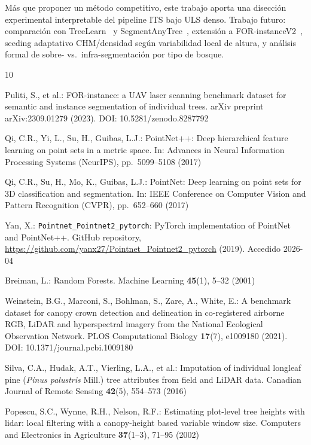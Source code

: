 \documentclass[runningheads]{llncs}
\begin{document}
Más que proponer un método competitivo, este trabajo aporta una disección experimental interpretable del pipeline ITS bajo ULS denso. Trabajo futuro: comparación con TreeLearn~\cite{henrich2024} y SegmentAnyTree~\cite{wielgosz2024}, extensión a FOR-instanceV2~\cite{xiang2025}, seeding adaptativo CHM/densidad según variabilidad local de altura, y análisis formal de sobre- vs.\ infra-segmentación por tipo de bosque.
\begin{thebibliography}{10}

Puliti, S., et al.:
FOR-instance: a UAV laser scanning benchmark dataset for semantic and instance segmentation of individual trees.
arXiv preprint arXiv:2309.01279 (2023).
DOI: 10.5281/zenodo.8287792

Qi, C.R., Yi, L., Su, H., Guibas, L.J.:
PointNet++: Deep hierarchical feature learning on point sets in a metric space.
In: Advances in Neural Information Processing Systems (NeurIPS), pp.~5099--5108 (2017)

Qi, C.R., Su, H., Mo, K., Guibas, L.J.:
PointNet: Deep learning on point sets for 3D classification and segmentation.
In: IEEE Conference on Computer Vision and Pattern Recognition (CVPR), pp.~652--660 (2017)

Yan, X.:
\texttt{Pointnet\_Pointnet2\_pytorch}: PyTorch implementation of PointNet and PointNet++.
GitHub repository, \url{https://github.com/yanx27/Pointnet_Pointnet2_pytorch} (2019). Accedido 2026-04

Breiman, L.:
Random Forests.
Machine Learning \textbf{45}(1), 5--32 (2001)

Weinstein, B.G., Marconi, S., Bohlman, S., Zare, A., White, E.:
A benchmark dataset for canopy crown detection and delineation in co-registered airborne RGB, LiDAR and hyperspectral imagery from the National Ecological Observation Network.
PLOS Computational Biology \textbf{17}(7), e1009180 (2021).
DOI: 10.1371/journal.pcbi.1009180

Silva, C.A., Hudak, A.T., Vierling, L.A., et al.:
Imputation of individual longleaf pine (\emph{Pinus palustris} Mill.) tree attributes from field and LiDAR data.
Canadian Journal of Remote Sensing \textbf{42}(5), 554--573 (2016)

Popescu, S.C., Wynne, R.H., Nelson, R.F.:
Estimating plot-level tree heights with lidar: local filtering with a canopy-height based variable window size.
Computers and Electronics in Agriculture \textbf{37}(1--3), 71--95 (2002)


\end{thebibliography}
\end{document}
